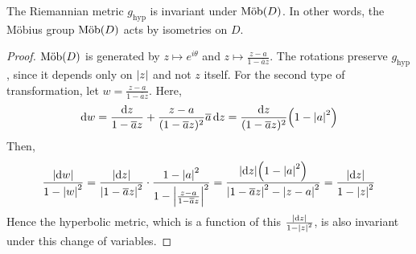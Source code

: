 \documentclass[a4paper]{article}
\begin{document}
\begin{lemma}
	The Riemannian metric \( g_{\text{hyp}} \) is invariant under \( \text{M\"ob}(D) \).
	In other words, the M\"obius group \( \text{M\"ob}(D) \) acts by isometries on \( D \).
\end{lemma}
\begin{proof}
	\( \text{M\"ob}(D) \) is generated by \( z \mapsto e^{i\theta} \) and \( z \mapsto \frac{z-a}{1-\overline a z} \).
	The rotations preserve \( g_{\text{hyp}} \), since it depends only on \( \abs{z} \) and not \( z \) itself.
	For the second type of transformation, let \( w = \frac{z-a}{1-\overline a z} \).
	Here,
	\[
		\dd{w} = \frac{\dd{z}}{1-\overline a z} + \frac{z-a}{(1-\overline a z)^2} \overline a \dd{z} = \frac{\dd{z}}{(1-\overline a z)^2} \qty(1 - \abs{a}^2)
	\]
	Then,
	\[
		\frac{\abs{\dd{w}}}{1-\abs{w}^2} = \frac{\abs{\dd{z}}}{\abs{1-\overline a z}^2} \cdot \frac{1 - \abs{a}^2}{1-\abs{\frac{z-a}{1-\overline a z}}^2} = \frac{\abs{\dd{z}} \qty(1-\abs{a}^2)}{\abs{1-\overline a z}^2 - \abs{z-a}^2} = \frac{\abs{\dd{z}}}{1-\abs{z}^2}
	\]
	Hence the hyperbolic metric, which is a function of this \( \frac{\abs{\dd{z}}}{1-\abs{z}^2} \), is also invariant under this change of variables.
\end{proof}
\end{document}
